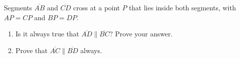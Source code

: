 Segments $\overline{AB}$ and $\overline{CD}$ cross at a point $P$ that lies inside both segments, with $AP=CP$ and $BP=DP$.
\begin{enumerate}
\item[(a)] Is it always true that $\overline{AD}\parallel\overline{BC}$? Prove your answer.
\item[(b)] Prove that $\overline{AC}\parallel\overline{BD}$ always.
\end{enumerate}
